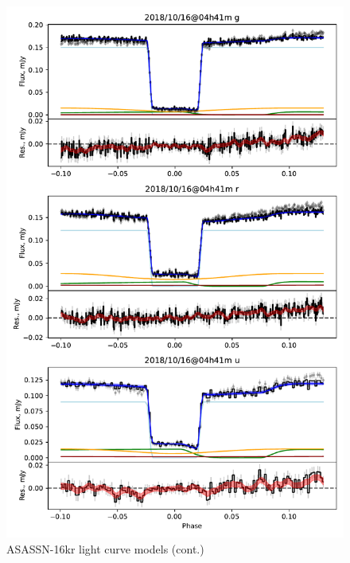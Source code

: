 \begin{figure}
    \centering
    \includegraphics[width=\textwidth]{figures/results/three_cvs_with_weird_colours/ASASSN-16kr/ASASSN-16kr_2.pdf}
    \caption{ASASSN-16kr light curve models (cont.)}
    \label{fig:ASASSN-16kr all light curves cont 1}
\end{figure}
